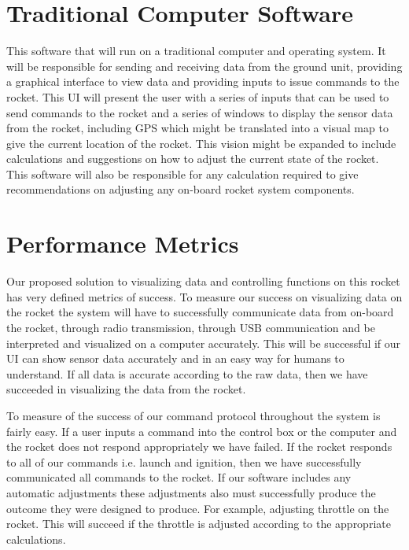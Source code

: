 \documentclass[12pt]{report}
\begin{document}
\section{Traditional Computer Software}
\sectionfont{\scshape}
This software that will run on a traditional computer and operating system. It will be responsible for sending and receiving data from the ground unit, providing a graphical interface to view data and providing inputs to issue commands to the rocket. This UI will present the user with a series of inputs that can be used to send commands to the rocket and a series of windows to display the sensor data from the rocket, including GPS which might be translated into a visual map to give the current location of the rocket. This vision might be expanded to include calculations and suggestions on how to adjust the current state of the rocket. This software will also be responsible for any calculation required to give recommendations on adjusting any on-board rocket system components.

\section{Performance Metrics}
\sectionfont{\scshape}
Our proposed solution to visualizing data and controlling functions on this rocket has very defined metrics of success. To measure our success on visualizing data on the rocket the system will have to successfully communicate data from on-board the rocket, through radio transmission, through USB communication and be interpreted and visualized on a computer accurately.  This will be successful if our UI can show sensor data accurately and in an easy way for humans to understand.  If all data is accurate according to the raw data, then we have succeeded in visualizing the data from the rocket.\par
To measure of the success of our command protocol throughout the system is fairly easy. If a user inputs a command into the control box or the computer and the rocket does not respond appropriately we have failed. If the rocket responds to all of our commands i.e. launch and ignition, then we have successfully communicated all commands to the rocket. If our software includes any automatic adjustments these adjustments also must successfully produce the outcome they were designed to produce. For example, adjusting throttle on the rocket. This will succeed if the throttle is adjusted according to the appropriate calculations.
\end{document}
